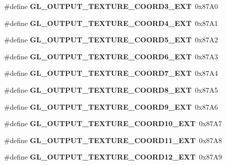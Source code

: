 \begin{DoxyCompactItemize}
\item 
\#define {\bfseries G\+L\+\_\+\+O\+U\+T\+P\+U\+T\+\_\+\+T\+E\+X\+T\+U\+R\+E\+\_\+\+C\+O\+O\+R\+D3\+\_\+\+E\+X\+T}~0x87\+A0\label{_s_d_l__opengl_8h_a4d741592af67e36886a69ee989709010}

\item 
\#define {\bfseries G\+L\+\_\+\+O\+U\+T\+P\+U\+T\+\_\+\+T\+E\+X\+T\+U\+R\+E\+\_\+\+C\+O\+O\+R\+D4\+\_\+\+E\+X\+T}~0x87\+A1\label{_s_d_l__opengl_8h_ab82698a3080aba91c0b08a7091583a84}

\item 
\#define {\bfseries G\+L\+\_\+\+O\+U\+T\+P\+U\+T\+\_\+\+T\+E\+X\+T\+U\+R\+E\+\_\+\+C\+O\+O\+R\+D5\+\_\+\+E\+X\+T}~0x87\+A2\label{_s_d_l__opengl_8h_a840894cc4babb4c49be6c376b253c8e6}

\item 
\#define {\bfseries G\+L\+\_\+\+O\+U\+T\+P\+U\+T\+\_\+\+T\+E\+X\+T\+U\+R\+E\+\_\+\+C\+O\+O\+R\+D6\+\_\+\+E\+X\+T}~0x87\+A3\label{_s_d_l__opengl_8h_a1445ff36b3f79a6c2e849f4c3caffbf6}

\item 
\#define {\bfseries G\+L\+\_\+\+O\+U\+T\+P\+U\+T\+\_\+\+T\+E\+X\+T\+U\+R\+E\+\_\+\+C\+O\+O\+R\+D7\+\_\+\+E\+X\+T}~0x87\+A4\label{_s_d_l__opengl_8h_a6cb2b4ec77526e7b1a7de99aa10e38d0}

\item 
\#define {\bfseries G\+L\+\_\+\+O\+U\+T\+P\+U\+T\+\_\+\+T\+E\+X\+T\+U\+R\+E\+\_\+\+C\+O\+O\+R\+D8\+\_\+\+E\+X\+T}~0x87\+A5\label{_s_d_l__opengl_8h_af220386f6564fe0f09d1f8d311519b12}

\item 
\#define {\bfseries G\+L\+\_\+\+O\+U\+T\+P\+U\+T\+\_\+\+T\+E\+X\+T\+U\+R\+E\+\_\+\+C\+O\+O\+R\+D9\+\_\+\+E\+X\+T}~0x87\+A6\label{_s_d_l__opengl_8h_a4ceadbb40b56dacd4c09d247622d9dc2}

\item 
\#define {\bfseries G\+L\+\_\+\+O\+U\+T\+P\+U\+T\+\_\+\+T\+E\+X\+T\+U\+R\+E\+\_\+\+C\+O\+O\+R\+D10\+\_\+\+E\+X\+T}~0x87\+A7\label{_s_d_l__opengl_8h_aaaa128c5c030ca7585e0c2eacaa17e50}

\item 
\#define {\bfseries G\+L\+\_\+\+O\+U\+T\+P\+U\+T\+\_\+\+T\+E\+X\+T\+U\+R\+E\+\_\+\+C\+O\+O\+R\+D11\+\_\+\+E\+X\+T}~0x87\+A8\label{_s_d_l__opengl_8h_aafa4f7b9b9df9f0011d87fbe3ab71294}

\item 
\#define {\bfseries G\+L\+\_\+\+O\+U\+T\+P\+U\+T\+\_\+\+T\+E\+X\+T\+U\+R\+E\+\_\+\+C\+O\+O\+R\+D12\+\_\+\+E\+X\+T}~0x87\+A9\label{_s_d_l__opengl_8h_a1403f2a0e9db502f0a56bfed923b145b}


\end{DoxyCompactItemize}
